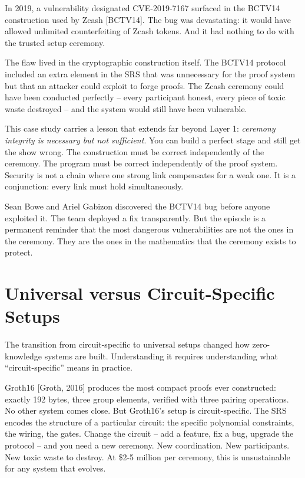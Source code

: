 \documentclass[
  11pt,
  openany]{report}
\begin{document}
In 2019, a vulnerability designated CVE-2019-7167 surfaced in the BCTV14
construction used by Zcash {[}BCTV14{]}. The bug was devastating: it would have
allowed unlimited counterfeiting of Zcash tokens. And it had nothing to do with
the trusted setup ceremony.

The flaw lived in the cryptographic construction itself. The BCTV14 protocol
included an extra element in the SRS that was unnecessary for the proof system
but that an attacker could exploit to forge proofs. The Zcash ceremony could
have been conducted perfectly -- every participant honest, every piece of toxic
waste destroyed -- and the system would still have been vulnerable.

This case study carries a lesson that extends far beyond Layer 1: \emph{ceremony
integrity is necessary but not sufficient}. You can build a perfect stage and
still get the show wrong. The construction must be correct independently of the
ceremony. The program must be correct independently of the proof system.
Security is not a chain where one strong link compensates for a weak one. It is
a conjunction: every link must hold simultaneously.

Sean Bowe and Ariel Gabizon discovered the BCTV14 bug before anyone exploited
it. The team deployed a fix transparently. But the episode is a permanent
reminder that the most dangerous vulnerabilities are not the ones in the
ceremony. They are the ones in the mathematics that the ceremony exists to
protect.

\section{Universal versus Circuit-Specific
Setups}\label{universal-versus-circuit-specific-setups}

The transition from circuit-specific to universal setups changed how
zero-knowledge systems are built. Understanding it requires understanding what
``circuit-specific'' means in practice.

Groth16 {[}Groth, 2016{]} produces the most compact proofs ever constructed:
exactly 192 bytes, three group elements, verified with three pairing operations.
No other system comes close. But Groth16's setup is circuit-specific. The SRS
encodes the structure of a particular circuit: the specific polynomial
constraints, the wiring, the gates. Change the circuit -- add a feature, fix a
bug, upgrade the protocol -- and you need a new ceremony. New coordination. New
participants. New toxic waste to destroy. At \$2-5 million per ceremony, this is
unsustainable for any system that evolves.
\end{document}
